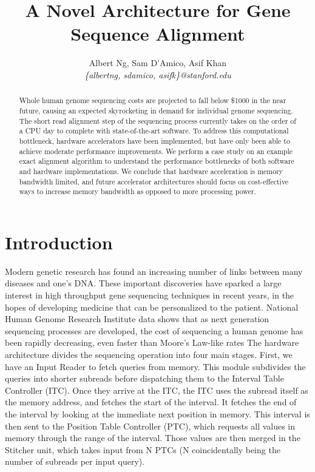 \documentclass[11pt]{article}
\title{A Novel Architecture for Gene Sequence Alignment}
\author{Albert Ng, Sam D'Amico, Asif Khan\\ \emph{\{albertng, sdamico, asifk\}@stanford.edu}}
\date{}
\begin{document}
\maketitle

\begin{abstract}

%

Whole human genome sequencing costs are projected to fall below \$1000 in the near future, causing an expected skyrocketing in demand for individual genome sequencing.  The short read alignment step of the sequencing process currently takes on the order of a CPU day to complete with state-of-the-art software.  To address this computational bottleneck, hardware accelerators have been implemented, but have only been able to achieve moderate performance improvements.  We perform a case study on an example exact alignment algorithm to understand the performance bottlenecks of both software and hardware implementations.  We conclude that hardware acceleration is memory bandwidth limited, and future accelerator architectures should focus on cost-effective ways to increase memory bandwidth as opposed to more processing power. 

\end{abstract}

%
%

\section{Introduction}
\par
Modern genetic research has found an increasing number of links between many diseases and one’s DNA.  These important discoveries have sparked a large interest in high throughput gene sequencing techniques in recent years, in the hopes of developing medicine that can be personalized to the patient.  National Human Genome Research Institute data shows that as next generation sequencing processes are developed, the cost of sequencing a human genome has been rapidly decreasing, even faster than Moore’s Law-like rates \cite{wetterstrand2011dna}	The hardware architecture divides the sequencing operation into four main stages.  First, we have an Input Reader to fetch queries from memory.  This module subdivides the queries into shorter subreads before dispatching them to the Interval Table Controller (ITC).  Once they arrive at the ITC, the ITC uses the subread itself as the memory address, and fetches the start of the interval.  It fetches the end of the interval by looking at the immediate next position in memory.  This interval is then sent to the Position Table Controller (PTC), which requests all values in memory through the range of the interval.  Those values are then merged in the Stitcher unit, which takes input from N PTCs (N coincidentally being the number of subreads per input query).
\end{document}
